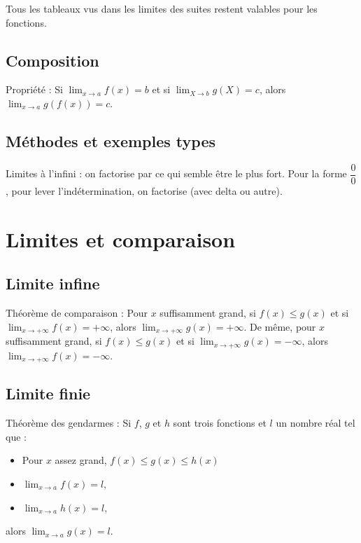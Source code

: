 \documentclass[11pt,a4paper]{article}
\begin{document}
Tous les tableaux vus dans les limites des suites restent valables pour les fonctions.

\subsection{Composition}

\begin{boiteProp}{Propriété :}
    Si $\displaystyle \lim_{x\to a} f(x) = b$ et si $\displaystyle \lim_{X\to b} g(X) = c$, alors $\displaystyle \lim_{x\to a} g(f(x)) = c$.
\end{boiteProp}

\subsection{Méthodes et exemples types}

Limites à l'infini : on factorise par ce qui semble être le plus fort.
Pour la forme $\dfrac{0}{0}$, pour lever l'indétermination, on factorise (avec delta ou autre).

\section{Limites et comparaison}

\subsection{Limite infine}

\begin{boiteProp}{Théorème de comparaison :}
    Pour $x$ suffisamment grand, si $f(x) \leq g(x)$ et si $\displaystyle \lim_{x\to +\infty} f(x) = +\infty$, alors $\displaystyle \lim_{x\to +\infty} g(x) = +\infty$.
    \newline
    De même, pour $x$ suffisamment grand, si $f(x) \leq g(x)$ et si $\displaystyle \lim_{x\to +\infty} g(x) = -\infty$, alors $\displaystyle \lim_{x\to +\infty} f(x) = -\infty$.
\end{boiteProp}

\subsection{Limite finie}

\begin{boiteProp}{Théorème des gendarmes :}
    Si $f$, $g$ et $h$ sont trois fonctions et $l$ un nombre réal tel que :
    \begin{itemize}
        \item Pour $x$ assez grand, $f(x) \leq g(x) \leq h(x)$
        \item $\displaystyle \lim_{x\to a} f(x) = l$,
        \item $\displaystyle \lim_{x\to a} h(x) = l$,
    \end{itemize}
    alors $\displaystyle \lim_{x\to a} g(x) = l$.
\end{boiteProp}
\end{document}
